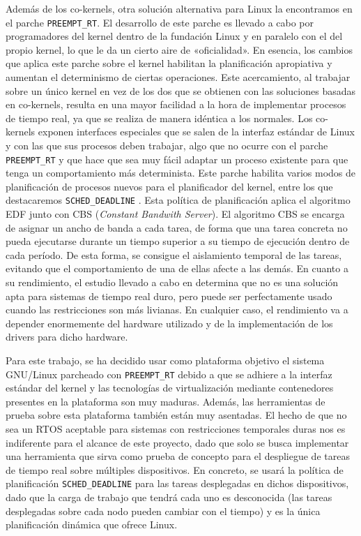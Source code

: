 Además de los co-kernels, otra solución alternativa para Linux la encontramos en
el parche \texttt{PREEMPT\_RT}. El desarrollo de este parche es llevado a cabo
por programadores del kernel dentro de la fundación Linux y en paralelo con el
del propio kernel, lo que le da un cierto aire de «oficialidad». En esencia, los
cambios que aplica este parche sobre el kernel habilitan la planificación
apropiativa y aumentan el determinismo de ciertas operaciones. Este
acercamiento, al trabajar sobre un único kernel en vez de los dos que se
obtienen con las soluciones basadas en co-kernels, resulta en una mayor
facilidad a la hora de implementar procesos de tiempo real, ya que se realiza de
manera idéntica a los normales. Los co-kernels exponen interfaces especiales que
se salen de la interfaz estándar de Linux y con las que sus procesos deben
trabajar, algo que no ocurre con el parche \texttt{PREEMPT\_RT} y que hace que
sea muy fácil adaptar un proceso existente para que tenga un comportamiento más
determinista. Este parche habilita varios modos de planificación de procesos
nuevos para el planificador del kernel, entre los que destacaremos
\texttt{SCHED\_DEADLINE} \cite{noauthor_deadline_nodate}. Esta política de
planificación aplica el algoritmo EDF junto con CBS (\textit{Constant Bandwith
  Server}). El algoritmo CBS se encarga de asignar un ancho de banda a cada tarea,
de forma que una tarea concreta no pueda ejecutarse durante un tiempo superior a
su tiempo de ejecución dentro de cada período. De esta forma, se consigue el
aislamiento temporal de las tareas, evitando que el comportamiento de una de
ellas afecte a las demás. En cuanto a su rendimiento, el estudio llevado a cabo
en \cite{reghenzani_real-time_2019} determina que no es una solución apta para
sistemas de tiempo real duro, pero puede ser perfectamente usado cuando las
restricciones son más livianas. En cualquier caso, el rendimiento va a depender
enormemente del hardware utilizado y de la implementación de los drivers para
dicho hardware.

Para este trabajo, se ha decidido usar como plataforma objetivo el sistema
GNU/Linux parcheado con \texttt{PREEMPT\_RT} debido a que se adhiere a la
interfaz estándar del kernel y las tecnologías de virtualización mediante
contenedores presentes en la plataforma son muy maduras. Además, las
herramientas de prueba sobre esta plataforma también están muy asentadas. El
hecho de que no sea un RTOS aceptable para sistemas con restricciones temporales
duras nos es indiferente para el alcance de este proyecto, dado que solo se
busca implementar una herramienta que sirva como prueba de concepto para el
despliegue de tareas de tiempo real sobre múltiples dispositivos. En concreto,
se usará la política de planificación \texttt{SCHED\_DEADLINE} para las tareas
desplegadas en dichos dispositivos, dado que la carga de trabajo que tendrá cada
uno es desconocida (las tareas desplegadas sobre cada nodo pueden cambiar con el
tiempo) y es la única planificación dinámica que ofrece Linux.